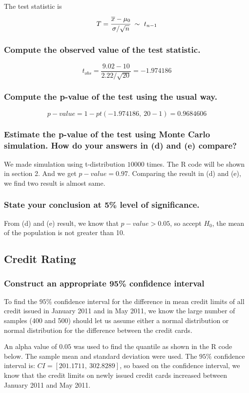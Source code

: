 \documentclass[11pt,letterpaper,titlepage,en-US]{article}
\begin{document}
The test statistic is \[T = \cfrac{\overline{x} - \mu_0}{\sigma / \sqrt{n}}\ \sim \ t_{n-1}\]

\subsubsection{Compute the observed value of the test statistic.}
\[t_{obs} = \frac{9.02 - 10}{2.22 / \sqrt{20}} = -1.974186\]

\subsubsection{Compute the p-value of the test using the usual way.}
\[p-value = 1 - pt(-1.974186,\ 20 - 1) = 0.9684606\]

\subsubsection{Estimate the p-value of the test using Monte Carlo simulation. How do your answers in (d) and (e) compare?}
We made simulation using t-distribution $10000$ times. The R code will be shown in section 2. And we get $p-value = 0.97$.
Comparing the result in (d) and (e), we find two result is almost same.

\subsubsection{State your conclusion at 5\% level of significance.}
From (d) and (e) result, we know that $p-value > 0.05$, so accept $H_0$, the mean of the population is not greater than 10.

\subsection{Credit Rating}
\subsubsection{Construct an appropriate 95\% confidence interval}
To find the $95\%$ confidence interval for the difference in mean credit limits of all credit issued in January 2011 and in May 2011, we know the large number of samples (400 and 500) should let us assume either a normal distribution or normal distribution for the difference between the credit cards.

An alpha value of $0.05$ was used to find the quantile as shown in the R code below. The sample mean and standard deviation were used. The $95\%$ confidence interval is: $CI = [201.1711,\ 302.8289]$, so based on the confidence interval, we know that the credit limits on newly issued credit cards increased between January 2011 and May 2011.
\end{document}
